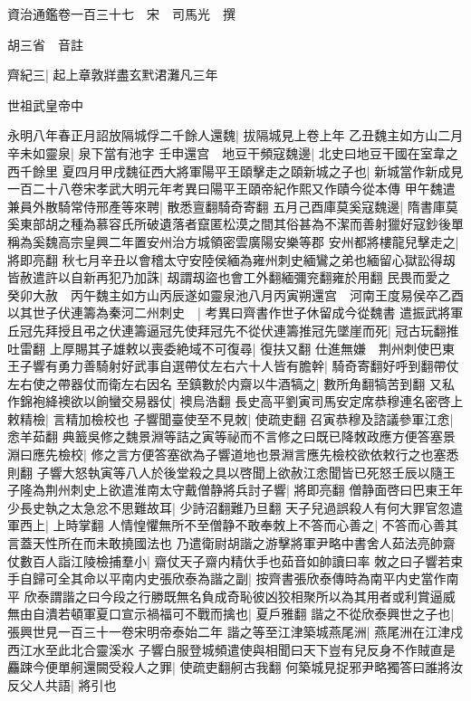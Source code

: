 資治通鑑卷一百三十七　宋　司馬光　撰

胡三省　音註

齊紀三|{
	起上章敦牂盡玄黓涒灘凡三年}


世祖武皇帝中

永明八年春正月詔放隔城俘二千餘人還魏|{
	拔隔城見上卷上年}
乙丑魏主如方山二月辛未如靈泉|{
	泉下當有池字}
壬申還宫　地豆干頻寇魏邊|{
	北史曰地豆干國在室韋之西千餘里}
夏四月甲戌魏征西大將軍陽平王頤擊走之頤新城之子也|{
	新城當作新成見一百二十八卷宋孝武大明元年考異曰陽平王頤帝紀作熙又作賾今從本傳}
甲午魏遣兼員外散騎常侍邢產等來聘|{
	散悉亶翻騎奇寄翻}
五月己酉庫莫奚寇魏邊|{
	隋書庫莫奚東部胡之種為慕容氏所破遺落者竄匿松漠之間其俗甚為不潔而善射獵好寇鈔後單稱為奚魏高宗皇興二年置安州治方城領密雲廣陽安樂等郡}
安州都將樓龍兒擊走之|{
	將即亮翻}
秋七月辛丑以會稽太守安陸侯緬為雍州刺史緬鸞之弟也緬留心獄訟得刼皆赦遣許以自新再犯乃加誅|{
	刼謂刼盜也會工外翻緬彌兖翻雍於用翻}
民畏而愛之　癸卯大赦　丙午魏主如方山丙辰遂如靈泉池八月丙寅朔還宫　河南王度易侯卒乙酉以其世子伏連籌為秦河二州刺史　|{
	考異曰齊書作世子休留成今從魏書}
遣振武將軍丘冠先拜授且弔之伏連籌逼冠先使拜冠先不從伏連籌推冠先墜崖而死|{
	冠古玩翻推吐雷翻}
上厚賜其子雄敕以喪委絶域不可復尋|{
	復扶又翻}
仕進無嫌　荆州刺使巴東王子響有勇力善騎射好武事自選帶仗左右六十人皆有膽幹|{
	騎奇寄翻好呼到翻帶仗左右使之帶器仗而衛左右因名}
至鎮數於内齋以牛酒犒之|{
	數所角翻犒苦到翻}
又私作錦袍絳襖欲以餉蠻交易器仗|{
	襖烏浩翻}
長史高平劉寅司馬安定席恭穆連名密啓上敕精檢|{
	言精加檢校也}
子響聞臺使至不見敇|{
	使疏吏翻}
召寅恭穆及諮議參軍江悆|{
	悆羊茹翻}
典籖吳修之魏景淵等詰之寅等祕而不言修之曰既已降敇政應方便答塞景淵曰應先檢校|{
	修之言方便答塞欲為子響道地也景淵言應先檢校欲依敕行之也塞悉則翻}
子響大怒執寅等八人於後堂殺之具以啓聞上欲赦江悆聞皆已死怒壬辰以隨王子隆為荆州刺史上欲遣淮南太守戴僧静將兵討子響|{
	將即亮翻}
僧静面啓曰巴東王年少長史執之太急忿不思難故耳|{
	少詩沼翻難乃旦翻}
天子兒過誤殺人有何大罪官忽遣軍西上|{
	上時掌翻}
人情惶懼無所不至僧静不敢奉敇上不答而心善之|{
	不答而心善其言蓋天性所在而未敢撓國法也}
乃遣衛尉胡諧之游擊將軍尹略中書舍人茹法亮帥齋仗數百人詣江陵檢捕羣小|{
	齋仗天子齋内精㐲手也茹音如帥讀曰率}
敇之曰子響若束手自歸可全其命以平南内史張欣泰為諧之副|{
	按齊書張欣泰傳時為南平内史當作南平}
欣泰謂諧之曰今段之行勝既無名負成奇恥彼凶狡相聚所以為其用者或利賞逼威無由自潰若頓軍夏口宣示禍福可不戰而擒也|{
	夏戶雅翻}
諧之不從欣泰興世之子也|{
	張興世見一百三十一卷宋明帝泰始二年}
諧之等至江津築城燕尾洲|{
	燕尾洲在江津戍西江水至此北合靈溪水}
子響白服登城頻遣使與相聞曰天下豈有兒反身不作賊直是麤踈今便單舸還闕受殺人之罪|{
	使疏吏翻舸古我翻}
何築城見捉邪尹略獨答曰誰將汝反父人共語|{
	將引也}
